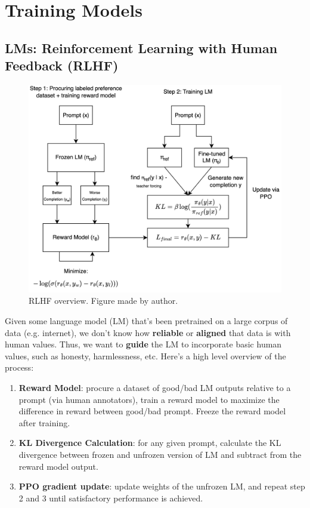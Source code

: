 \documentclass[12pt]{article}
\begin{document}
\section{Training Models}

\subsection{LMs: Reinforcement Learning with Human Feedback (RLHF)}

\begin{figure}[htbp]
    \centering
    \includegraphics[width=1\textwidth]{../media/rlhf_light.png}
    \caption{RLHF overview. Figure made by author.}
    \label{fig:rlhf}
\end{figure}

Given some language model (LM) that's been pretrained on a large corpus of data (e.g. internet), we don't know how \textbf{reliable} or \textbf{aligned} that data is with human values. Thus, we want to \textbf{guide} the LM to incorporate basic human values, such as honesty, harmlessness, etc. Here's a high level overview of the process:

\begin{enumerate}
    \item \textbf{Reward Model}: procure a dataset of good/bad LM outputs relative to a prompt (via human annotators), train a reward model to maximize the difference in reward between good/bad prompt. Freeze the reward model after training. 
    \item \textbf{KL Divergence Calculation}: for any given prompt, calculate the KL divergence between frozen and unfrozen version of LM and subtract from the reward model output. 
    \item \textbf{PPO gradient update}: update weights of the unfrozen LM, and repeat step 2 and 3 until satisfactory performance is achieved. 
\end{enumerate}
\end{document}
